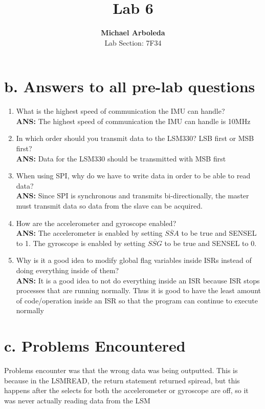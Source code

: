 \documentclass[11pt]{article}
\theoremstyle{plain}
\theoremstyle{definition}
\begin{document}
\captionsetup[figure]{labelfont=bf} 

\title{Lab 6}
\author{\textbf{Michael Arboleda}\\Lab Section: 7F34}
\maketitle
%
%
\section*{b. Answers to all pre-lab questions}



\begin{enumerate}[label={\arabic*)},font={\color{red}\bfseries}]
	\item What is the highest speed of communication the IMU
	can handle?
	\\[0.8ex]
	\textbf{ANS: } The highest speed of communication the IMU can handle is 10MHz
	\item In which order should you transmit data to the LSM330? LSB first or MSB first?
	\\[0.8ex]
	\textbf{ANS: } Data for the LSM330 should be transmitted with MSB first
	\item When using SPI, why do we have to write data in order to be able to read data? 
	\\[0.8ex]
	\textbf{ANS: } Since SPI is synchronous and transmits bi-directionally, the master must transmit data so data from the slave can be acquired.
	\item How are the accelerometer and gyroscope enabled?
	\\[0.8ex]
	\textbf{ANS: } The accelerometer is enabled by setting $\overline{SSA}$ to be true and SEN\textunderscore SEL to 1. The gyroscope is enabled by setting $\overline{SSG}$ to be true and SEN\textunderscore SEL to 0.
	\item Why is it a good idea to modify global flag variables inside ISRs instead of doing everything inside of them?
	\\[0.8ex]
	\textbf{ANS: } It is a good idea to not do everything inside an ISR because ISR stops processes that are running normally. Thus it is good to have the least amount of code/operation inside an ISR so that the program can continue to execute normally
\end{enumerate}
%
%
\section*{c. Problems Encountered} 
Problems encounter was that the wrong data was being outputted. This is because in the LSM\textunderscore READ, the return statement returned spi\textunderscore read, but this happens after the selects for both the accelerometer or gyroscope are off, so it was never actually reading data from the LSM
%
%
\end{document}
